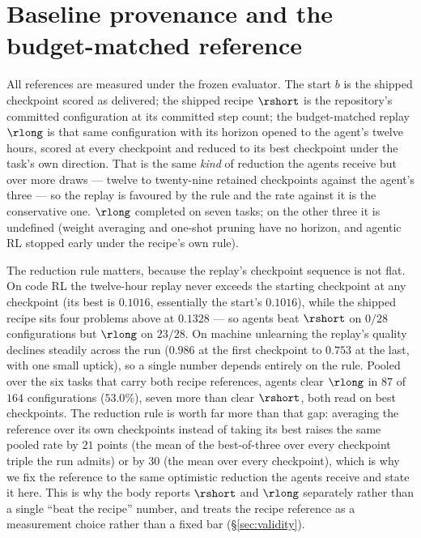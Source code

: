 \section{Baseline provenance and the budget-matched reference}
\label{app:baselines}

All references are measured under the frozen evaluator. The start $b$ is the shipped checkpoint scored
as delivered; the shipped recipe $\rshort$ is the repository's committed configuration at its committed
step count; the budget-matched replay $\rlong$ is that same configuration with its horizon opened to the
agent's twelve hours, scored at every checkpoint and reduced to its best checkpoint under the
task's own direction. That is the same \emph{kind} of reduction the agents receive but over more
draws --- twelve to twenty-nine retained checkpoints against the agent's three --- so the replay is
favoured by the rule and the rate against it is the conservative one. $\rlong$ completed on seven tasks;
on the other three it is undefined (weight averaging and one-shot pruning have no horizon, and agentic
RL stopped early under the recipe's own rule).

The reduction rule matters, because the replay's checkpoint sequence is not flat. On code RL the
twelve-hour replay never exceeds the starting checkpoint at any checkpoint (its best is $0.1016$,
essentially the start's $0.1016$), while the shipped recipe sits four problems above at $0.1328$ ---
so agents beat $\rshort$ on $0/28$ configurations but $\rlong$ on $23/28$. On machine unlearning the replay's quality declines steadily
across the run ($0.986$ at the first checkpoint to $0.753$ at the last, with one small uptick), so a
single number depends entirely on the rule. Pooled over the six tasks that carry both recipe
references, agents clear $\rlong$ in $87$ of $164$ configurations ($53.0\%$), seven more than clear
$\rshort$, both read on best checkpoints. The reduction rule is worth
far more than that gap: averaging the reference over its own checkpoints instead of taking its best
raises the same pooled rate by $21$ points (the mean of the best-of-three over every checkpoint triple
the run admits) or by $30$ (the mean over every checkpoint), which is why we fix the reference to the same optimistic
reduction the agents receive and state it here. This is why the body reports $\rshort$ and $\rlong$ separately
rather than a single ``beat the recipe'' number, and treats the recipe reference as a measurement
choice rather than a fixed bar (\S\ref{sec:validity}).


